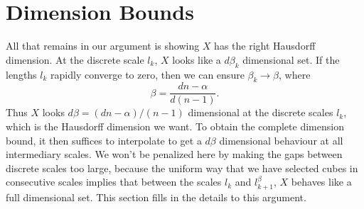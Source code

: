 \documentclass[usenames,dvipsnames]{article}
\theoremstyle{plain}
\theoremstyle{plain}
\begin{document}

%
%

\section{Dimension Bounds}

All that remains in our argument is showing $X$ has the right Hausdorff dimension. At the discrete scale $l_k$, $X$ looks like a $d \beta_k$ dimensional set. If the lengths $l_k$ rapidly converge to zero, then we can ensure $\beta_k \to \beta$, where
%
\[ \beta = \frac{dn - \alpha}{d(n - 1)}. \]
%
Thus $X$ looks $d \beta = (dn - \alpha) / (n-1)$ dimensional at the discrete scales $l_k$, which is the Hausdorff dimension we want. To obtain the complete dimension bound, it then suffices to interpolate to get a $d\beta$ dimensional behaviour at all intermediary scales. We won't be penalized here by making the gaps between discrete scales too large, because the uniform way that we have selected cubes in consecutive scales implies that between the scales $l_k$ and $l_{k+1}^\beta$, $X$ behaves like a full dimensional set. This section fills in the details to this argument.
\end{document}
